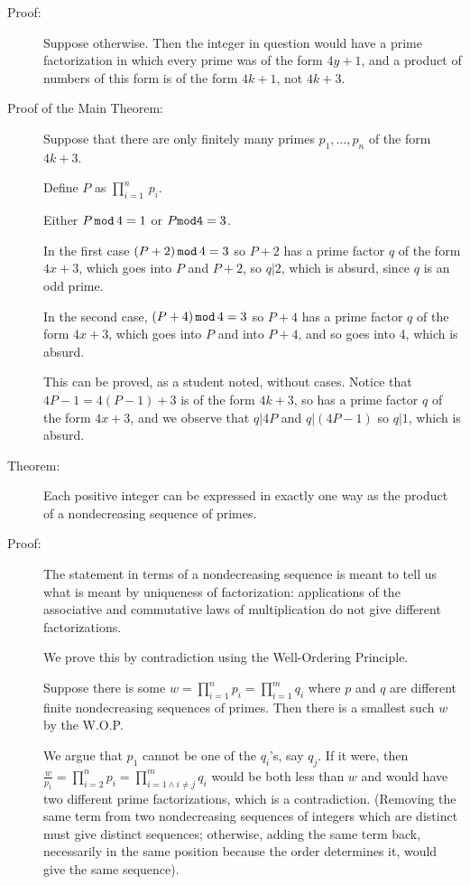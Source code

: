 \documentclass[12pt]{article}
\begin{document}
\begin{description}
\item[Proof:]  Suppose otherwise.  Then the integer in question would have a prime factorization in which every prime was of the form $4y+1$, and a product of numbers of this form is of the form $4k+1$, not $4k+3$.

\item[Proof of the Main Theorem:]  Suppose that there are only finitely many primes $p_1,\ldots,p_n$ of the form $4k+3$.

Define $P$ as $\prod_{i=1}^n \, p_i$.

Either $P\,{\tt mod}\,4=1$ or $P{\tt mod 4}=3$.

In the first case $(P+2)\,{\tt mod}\,4 = 3$ so $P+2$ has a prime factor $q$ of the form $4x+3$, which goes into $P$ and $P+2$, so $q|2$, which is absurd, since $q$ is an odd prime.

In the second case, $(P+4)\,{\tt mod}\,4=3$ so $P+4$ has a prime factor $q$ of the form $4x+3$, which goes into $P$ and into $P+4$, and so goes into 4, which is absurd.

This can be proved, as a student noted, without cases.  Notice that $4P-1 = 4(P-1)+3$ is of the form $4k+3$, so has a prime factor $q$ of the form $4x+3$, and we observe that $q|4P$ and $q|(4P-1)$ so $q|1$, which is absurd.

\item[Theorem:]  Each positive integer can be expressed in exactly one way as the product of a nondecreasing sequence of primes.

\item[Proof:]  The statement in terms of a nondecreasing sequence is meant to tell us what is meant by uniqueness of factorization:  applications of the associative and commutative laws of multiplication do not give different factorizations.

We prove this by contradiction using the Well-Ordering Principle.

Suppose there is some $w = \prod_{i=1}^n p_i = \prod_{i=1}^m q_i$ where $p$ and $q$ are different finite nondecreasing sequences of primes.
Then there is a smallest such $w$ by the W.O.P.

We argue that $p_1$ cannot be one of the $q_i$'s, say $q_j$.  If it were, then $\frac w{p_1} = \prod_{i=2}^n p_i = \prod_{i=1 \wedge i\neq j}^m q_i$  would be both less than $w$ and would have two different prime factorizations, which is a contradiction.  (Removing the same term from two nondecreasing sequences of integers which are distinct must give distinct sequences; otherwise, adding the same term back, necessarily in the same position because the order determines it, would give the same sequence).


\end{description}
\end{document}
